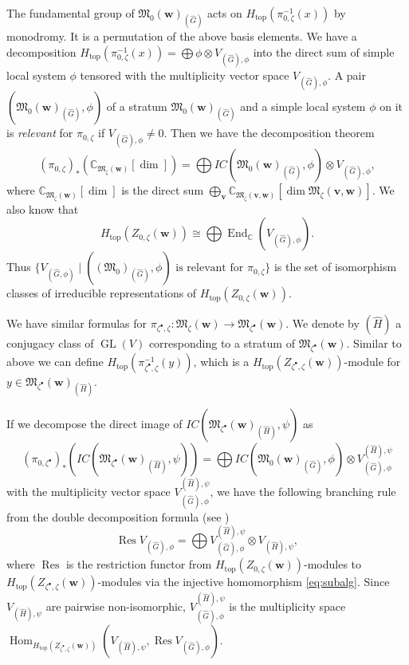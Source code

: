 \documentclass[11pt]{article}
\theoremstyle{definition}
\numberwithin{equation}{section}
\newcommand{\C}{{\mathbb C}}
\newcommand{\GL}{\operatorname{GL}}
\newcommand{\End}{\operatorname{End}}
\newcommand{\Hom}{\operatorname{Hom}}
\newcommand{\M}{{\mathfrak M}} %
\newcommand{\bv}{{\mathbf v}} %
\newcommand{\bw}{{\mathbf w}} %
\newcommand{\topdeg}{{\operatorname{top}}} %
\newcommand{\Res}{\operatorname{Res}}
\begin{document}
The fundamental group of $\M_0(\bw)_{(\widehat G)}$ acts on
$H_\topdeg(\pi_{0,\zeta}^{-1}(x))$ by monodromy. It is a permutation
of the above basis elements. We have a decomposition
\(
  H_\topdeg(\pi_{0,\zeta}^{-1}(x)) = \bigoplus \phi\otimes V_{(\widehat{G}),\phi}
\)
into the direct sum of simple local system $\phi$ tensored with the
multiplicity vector space $V_{(\widehat G),\phi}$.
%
A pair $(\M_0(\bw)_{(\widehat G)},\phi)$ of a stratum
$\M_0(\bw)_{(\widehat G)}$ and a simple local system $\phi$ on it is
{\it relevant\/} for $\pi_{0,\zeta}$ if $V_{(\widehat G),\phi}\neq 0$.
%
Then we have the decomposition theorem
\begin{equation*}
  (\pi_{0,\zeta})_*(\C_{\M_\zeta(\bw)}[\dim])
  = \bigoplus IC(\M_0(\bw)_{(\widehat G)},\phi) \otimes V_{(\widehat
    G),\phi},
\end{equation*}
where $\C_{\M_\zeta(\bw)}[\dim]$ is the direct sum
$\bigoplus_\bv \C_{\M_\zeta(\bv,\bw)}[\dim \M_\zeta(\bv,\bw)]$.
%
We also know \cite[8.9.8]{CG} that
\begin{equation}\label{eq:convalg}
  H_{\topdeg}(Z_{0,\zeta}(\bw)) \cong \bigoplus \End_\C(V_{(\widehat G),\phi}).
\end{equation}
Thus $\{ V_{(\widehat G,\phi)} \mid \text{$((\M_0)_{(\widehat
    G)},\phi)$ is relevant for $\pi_{0,\zeta}$}\}$ is the set of
isomorphism classes of irreducible representations of
$H_{\topdeg}(Z_{0,\zeta}(\bw))$.

We have similar formulas for $\pi_{\zeta^\bullet,\zeta}\colon
\M_{\zeta}(\bw)\to \M_{\zeta^\bullet}(\bw)$. We denote by $(\widehat H)$
a conjugacy class of $\GL(V)$ corresponding to a stratum of
$\M_{\zeta^\bullet}(\bw)$.
%
Similar to above we can def\/ine
$H_{\topdeg}(\pi_{\zeta^\bullet,\zeta}^{-1}(y))$, which is a
$H_\topdeg(Z_{\zeta^\bullet,\zeta}(\bw))$-module for
$y\in \M_{\zeta^\bullet}(\bw)_{(\widehat H)}$.

If we decompose the direct image of
$IC(\M_{\zeta^\bullet}(\bw)_{(\widehat H)},\psi)$ as
\begin{equation}\label{eq:bullet}
   (\pi_{0,\zeta^\bullet})_*(IC(\M_{\zeta^\bullet}(\bw)_{(\widehat
     H)},\psi))
   = \bigoplus IC(\M_0(\bw)_{(\widehat G)},\phi)\otimes
     V_{(\widehat G),\phi}^{(\widehat H),\psi}
\end{equation}
with the multiplicity vector space $V_{(\widehat G),\phi}^{(\widehat
  H),\psi}$, we have the following branching rule from the double
decomposition formula (see \cite[1.11]{BM})
\begin{equation}\label{eq:branching}
   \Res V_{(\widehat G),\phi} = \bigoplus
   V_{(\widehat G),\phi}^{(\widehat H),\psi} \otimes V_{(\widehat H),\psi},
\end{equation}
where $\Res$ is the restriction functor from
$H_{\topdeg}(Z_{0,\zeta}(\bw))$-modules to
$H_{\topdeg}(Z_{\zeta^\bullet,\zeta}(\bw))$-modules via the injective
homomorphism \eqref{eq:subalg}. Since $V_{(\widehat H),\psi}$ are
pairwise non-isomorphic, $V_{(\widehat G),\phi}^{(\widehat H),\psi}$
is the multiplicity space
\(
   \Hom_{H_{\topdeg}(Z_{\zeta^\bullet,\zeta}(\bw))}
   (V_{(\widehat H),\psi}, \Res V_{(\widehat G),\phi}).
\)
\end{document}
